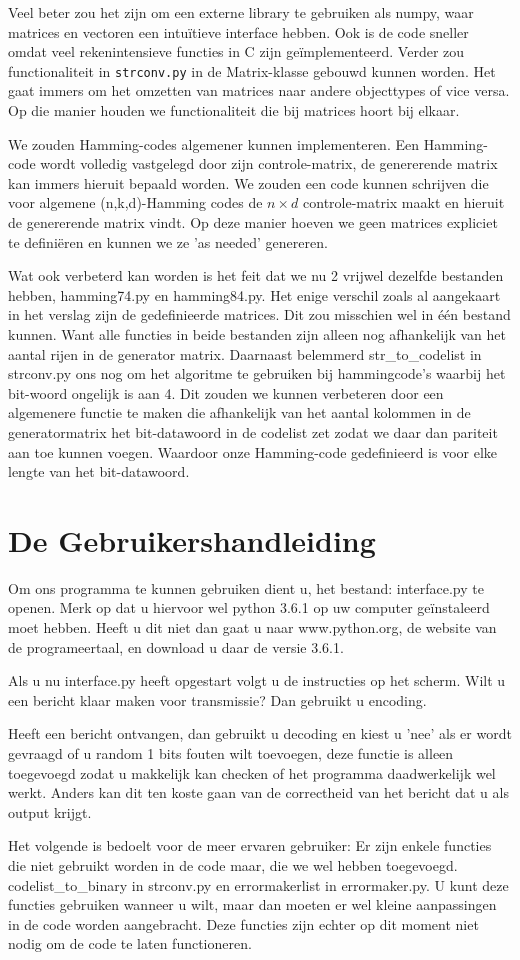 \documentclass[a4paper]{article}
\begin{document}
Veel beter zou het zijn om een externe library te gebruiken als numpy, waar matrices en vectoren een intuïtieve interface hebben. Ook is de code sneller omdat veel rekenintensieve functies in C zijn geïmplementeerd. Verder zou functionaliteit in \texttt{strconv.py} in de Matrix-klasse gebouwd kunnen worden. Het gaat immers om het omzetten van matrices naar andere objecttypes of vice versa. Op die manier houden we functionaliteit die bij matrices hoort bij elkaar.

We zouden Hamming-codes algemener kunnen implementeren. Een Hamming-code wordt volledig vastgelegd door zijn controle-matrix, de genererende matrix kan immers hieruit bepaald worden. We zouden een code kunnen schrijven die voor algemene (n,k,d)-Hamming codes de \(n \times d\) controle-matrix maakt en hieruit de genererende matrix vindt. Op deze manier hoeven we geen matrices expliciet te definiëren en kunnen we ze 'as needed' genereren.

Wat ook verbeterd kan worden is het feit dat we nu 2 vrijwel dezelfde bestanden hebben, hamming74.py en hamming84.py. Het enige verschil zoals al aangekaart in het verslag zijn de gedefinieerde matrices. Dit zou misschien wel in \'e\'en bestand kunnen. Want alle functies in beide bestanden zijn alleen nog afhankelijk van het aantal rijen in de generator matrix. Daarnaast belemmerd str\_to\_codelist in strconv.py ons nog om het algoritme te gebruiken bij hammingcode's waarbij het bit-woord ongelijk is aan 4. Dit zouden we kunnen verbeteren door een algemenere functie te maken die afhankelijk van het aantal kolommen in de generatormatrix het bit-datawoord in de codelist zet zodat we daar dan pariteit aan toe kunnen voegen. Waardoor onze Hamming-code gedefinieerd is voor elke lengte van het bit-datawoord.

\section{De Gebruikershandleiding}
Om ons programma te kunnen gebruiken dient u, het bestand: interface.py te openen. Merk op dat u hiervoor wel python 3.6.1 op uw computer ge\"instaleerd moet hebben. Heeft u dit niet dan gaat u naar www.python.org, de website van de programeertaal, en download u daar de versie 3.6.1.

Als u nu interface.py heeft opgestart volgt u de instructies op het scherm. Wilt u een bericht klaar maken voor transmissie? Dan gebruikt u encoding.

Heeft een bericht ontvangen, dan gebruikt u decoding en kiest u 'nee' als er wordt gevraagd of u random 1 bits fouten wilt toevoegen, deze functie is alleen toegevoegd zodat u makkelijk kan checken of het programma daadwerkelijk wel werkt. Anders kan dit ten koste gaan van de correctheid van het bericht dat u als output krijgt.

Het volgende is bedoelt voor de meer ervaren gebruiker:
Er zijn enkele functies die niet gebruikt worden in de code maar, die we wel hebben toegevoegd. codelist\_to\_binary in strconv.py en errormakerlist in errormaker.py. U kunt deze functies gebruiken wanneer u wilt, maar dan moeten er wel kleine aanpassingen in de code worden aangebracht. Deze functies zijn echter op dit moment niet nodig om de code te laten functioneren.
\end{document}
